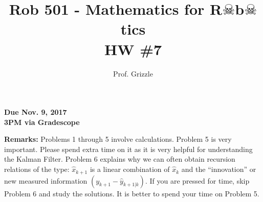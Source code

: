 \documentclass[letterpaper]{article}
\author{Prof. Grizzle}
\title{Rob 501 - Mathematics for R$\skull$b$\skull$tics\\
HW \#7}
\begin{document}
\date{}
\maketitle


 \newcommand{\trace}{\mathrm{trace}}
\newcommand{\real}{\mathbb R}  %
\newcommand{\nat}{\mathbb N}   %
\newcommand{\cp}{\mathbb C}    %
\newcommand{\ds}{\displaystyle}
\newcommand{\mf}[2]{\frac{\ds #1}{\ds #2}}
\newcommand{\Nagy}[2]{{Nagy, Page~#1, }{Prob.~#2}}
\newcommand{\spanof}[1]{\textrm{span} \{ #1 \}}
\parindent 0pt


\begin{flushright}
{\bfseries Due Nov. 9, 2017} \\
{\bfseries 3PM via Gradescope} \\[3mm]
\end{flushright}

\noindent \textbf{Remarks:}  Problems 1 through 5 involve calculations. Problem 5 is very important. Please spend extra time on it as it is very helpful for understanding the Kalman Filter. Problem 6 explains why we can often obtain recursion relations of the type: $ \widehat{x}_{k+1}$ is a linear combination of $\widehat{x}_k$ and the ``innovation'' or new measured information $ (y_{k+1} - \widehat{y}_{k+1|k} )$. If you are pressed for time, skip Problem 6 and study the solutions. It is better to spend your time on Problem 5.
\end{document}

